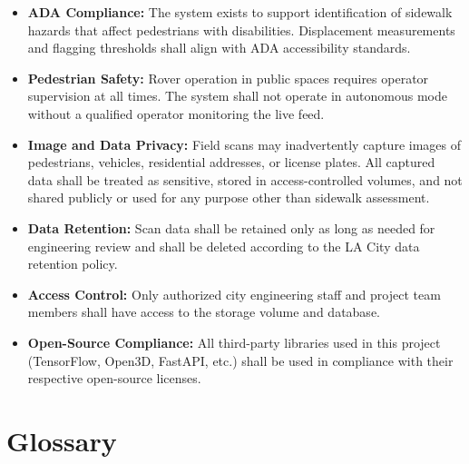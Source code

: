 \documentclass{article}
\begin{document}
\begin{itemize}
  \item \textbf{ADA Compliance:} The system exists to support identification of
    sidewalk hazards that affect pedestrians with disabilities. Displacement
    measurements and flagging thresholds shall align with ADA accessibility standards.
  \item \textbf{Pedestrian Safety:} Rover operation in public spaces requires
    operator supervision at all times. The system shall not operate in autonomous
    mode without a qualified operator monitoring the live feed.
  \item \textbf{Image and Data Privacy:} Field scans may inadvertently capture images
    of pedestrians, vehicles, residential addresses, or license plates. All captured
    data shall be treated as sensitive, stored in access-controlled volumes, and not
    shared publicly or used for any purpose other than sidewalk assessment.
  \item \textbf{Data Retention:} Scan data shall be retained only as long as needed
    for engineering review and shall be deleted according to the LA City data
    retention policy.
  \item \textbf{Access Control:} Only authorized city engineering staff and project
    team members shall have access to the storage volume and database.
  \item \textbf{Open-Source Compliance:} All third-party libraries used in this
    project (TensorFlow, Open3D, FastAPI, etc.) shall be used in compliance with
    their respective open-source licenses.
\end{itemize}

\section{Glossary}
\label{sec:glossary}
\end{document}
